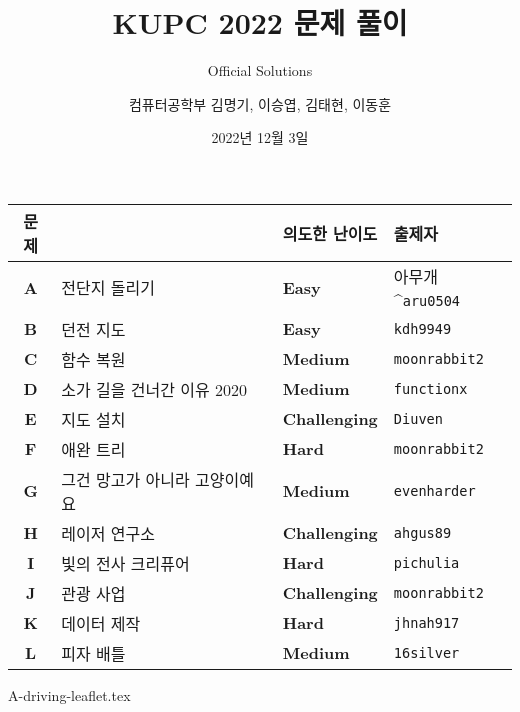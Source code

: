 
\usetikzlibrary{arrows.meta,matrix,decorations.pathreplacing}

\title{KUPC 2022 문제 풀이}
\subtitle{Official Solutions}
\author{컴퓨터공학부 김명기, 이승엽, 김태현, 이동훈}
\date{2022년 12월 3일}


    \setcounter{framenumber}{-1}
    \frame{\titlepage}
        
    \begin{frame} %
        \begin{center}
            \begin{tabular}{cl|l|l}
                \hline
                문제 & & 의도한 난이도 & 출제자 \\
                \hline
                \hline
                \textbf{A} & 전단지 돌리기& \textbf{\color{acgold}Easy} & 아무개^{\texttt{aru0504}} \\
                \textbf{B} & 던전 지도 & \textbf{\color{acgold}Easy} & \texttt{kdh9949} \\
                \textbf{C} & 함수 복원 & \textbf{\color{acplatinum}Medium} & \texttt{moonrabbit2} \\
                \textbf{D} & 소가 길을 건너간 이유 2020 & \textbf{\color{acplatinum}Medium} & \texttt{functionx} \\
                \textbf{E} & 지도 설치 & \textbf{\color{acdiamond}Challenging} & \texttt{Diuven} \\
                \textbf{F} & 애완 트리 & \textbf{\color{acdiamond}Hard} & \texttt{moonrabbit2} \\
                \textbf{G} & 그건 망고가 아니라 고양이예요 & \textbf{\color{acplatinum}Medium} & \texttt{evenharder} \\
                \textbf{H} & 레이저 연구소 & \textbf{\color{acdiamond}Challenging} & \texttt{ahgus89} \\
                \textbf{I} & 빛의 전사 크리퓨어 & \textbf{\color{acdiamond}Hard} & \texttt{pichulia} \\
                \textbf{J} & 관광 사업 & \textbf{\color{acruby}Challenging} & \texttt{moonrabbit2} \\
                \textbf{K} & 데이터 제작 & \textbf{\color{acdiamond}Hard} & \texttt{jhnah917} \\
                \textbf{L} & 피자 배틀 & \textbf{\color{acplatinum}Medium} & \texttt{16silver} \\
                \hline
            \end{tabular}
        \end{center}
    \end{frame}
    {A-driving-leaflet.tex}

